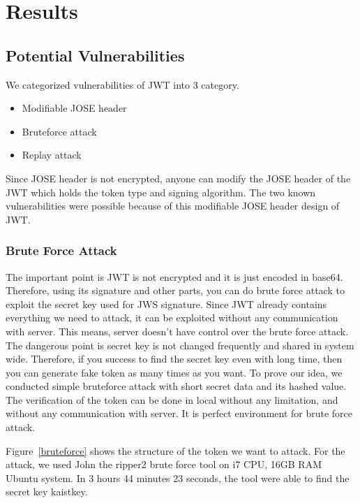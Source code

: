 \documentclass[journal,article,submit,moreauthors,pdftex,10pt,a4paper]{mdpi}
\begin{document}
\section{Results}
\subsection{Potential Vulnerabilities}
We categorized vulnerabilities of JWT into 3 category.
\begin{itemize}[leftmargin=*,labelsep=4mm]
\item Modifiable JOSE header
\item Bruteforce attack
\item Replay attack
\end{itemize}

Since JOSE header is not encrypted, anyone can modify the JOSE header of the JWT which holds the token type and signing algorithm. The two known vulnerabilities were possible because of this modifiable JOSE header design of JWT.


\subsubsection{Brute Force Attack}

The important point is JWT is not encrypted and it is just encoded in base64. Therefore, using its signature and other parts, you can do brute force attack to exploit the secret key used for JWS signature. Since JWT already contains everything we need to attack, it can be exploited without any communication with server. This means, server doesn't have control over the brute force attack. The dangerous point is secret key is not changed frequently and shared in system wide. Therefore, if you success to find the secret key even with long time, then you can generate fake token as many times as you want. To prove our idea, we conducted simple bruteforce attack with short secret data and its hashed value. The verification of the token can be done in local without any limitation, and without any communication with server. It is perfect environment for brute force attack.

Figure~\ref{bruteforce} shows the structure of the token we want to attack. For the attack, we used John the ripper2 %
brute force tool on i7 CPU, 16GB RAM Ubuntu system. In 3 hours 44 minutes 23 seconds, the tool were able to find the secret key kaistkey.
\end{document}
